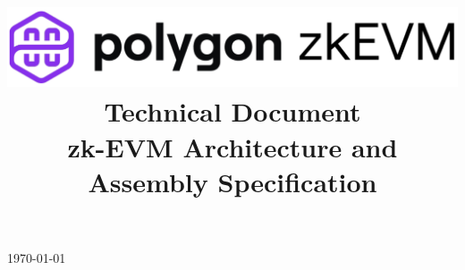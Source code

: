 \documentclass[preprint]{iacrtrans}
\title{
    \includegraphics[width=\columnwidth]{logo_zkEVM.png} 	\\ \vspace{0.3cm}
    Technical Document 										\\ \vspace{0.3cm}	
    zk-EVM Architecture and Assembly Specification \vspace{0.3cm}
    \version
}
\institute{}
\begin{document}
    
    
\begin{titlepage}
    \centering
    \maketitle
    \today
    \vspace{-5mm}
\end{titlepage}


{\hypersetup{linkcolor=.}\tableofcontents}

\newpage







\newpage


\end{document}
